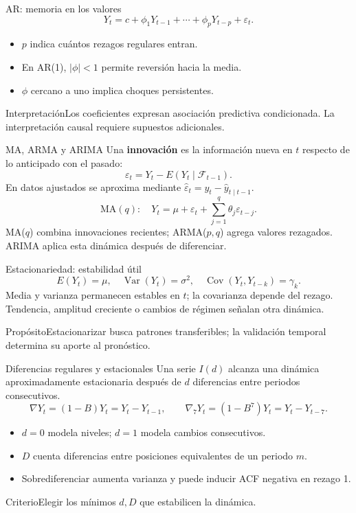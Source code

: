 \documentclass[aspectratio=169,10pt]{beamer}
\newcommand{\concepto}[1]{\textcolor{UAPTeal}{\textbf{#1}}}
\begin{document}
\begin{frame}{AR: memoria en los valores}\small
\[Y_t=c+\phi_1Y_{t-1}+\cdots+\phi_pY_{t-p}+\varepsilon_t.\]
\begin{itemize}\item $p$ indica cuántos rezagos regulares entran.\item En AR(1), $|\phi|<1$ permite reversión hacia la media.\item $\phi$ cercano a uno implica choques persistentes.\end{itemize}
\begin{alertblock}{Interpretación}Los coeficientes expresan asociación predictiva condicionada. La interpretación causal requiere supuestos adicionales.\end{alertblock}
\end{frame}

\begin{frame}{MA, ARMA y ARIMA}\small
Una \concepto{innovación} es la información nueva en $t$ respecto de lo anticipado con el pasado:
\[\varepsilon_t=Y_t-E(Y_t\mid\mathcal F_{t-1}).\]
En datos ajustados se aproxima mediante $\widehat\varepsilon_t=y_t-\widehat y_{t\mid t-1}$.
\[\text{MA}(q):\quad Y_t=\mu+\varepsilon_t+\sum_{j=1}^{q}\theta_j\varepsilon_{t-j}.\]
MA($q$) combina innovaciones recientes; ARMA($p,q$) agrega valores rezagados. ARIMA aplica esta dinámica después de diferenciar.
\end{frame}

\begin{frame}{Estacionariedad: estabilidad útil}\small
\[E(Y_t)=\mu,\quad \operatorname{Var}(Y_t)=\sigma^2,\quad \operatorname{Cov}(Y_t,Y_{t-k})=\gamma_k.\]
Media y varianza permanecen estables en $t$; la covarianza depende del rezago. Tendencia, amplitud creciente o cambios de régimen señalan otra dinámica.
\begin{block}{Propósito}Estacionarizar busca patrones transferibles; la validación temporal determina su aporte al pronóstico.\end{block}
\end{frame}

\begin{frame}{Diferencias regulares y estacionales}\small
Una serie $I(d)$ alcanza una dinámica aproximadamente estacionaria después de $d$ diferencias entre periodos consecutivos.
\[\nabla Y_t=(1-B)Y_t=Y_t-Y_{t-1},\qquad \nabla_7Y_t=(1-B^7)Y_t=Y_t-Y_{t-7}.\]
\begin{itemize}\item $d=0$ modela niveles; $d=1$ modela cambios consecutivos.\item $D$ cuenta diferencias entre posiciones equivalentes de un periodo $m$.\item Sobrediferenciar aumenta varianza y puede inducir ACF negativa en rezago 1.\end{itemize}
\begin{block}{Criterio}Elegir los mínimos $d,D$ que estabilicen la dinámica.\end{block}
\end{frame}
\end{document}
